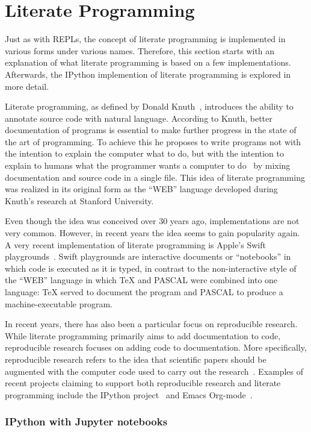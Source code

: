 \section{Literate Programming}
\label{sec:literate-programming}

Just as with REPLs, the concept of literate programming is implemented in
various forms under various names. Therefore, this section starts with an
explanation of what literate programming is based on a few implementations.
Afterwards, the IPython implemention of literate programming is explored in more
detail.

Literate programming, as defined by Donald Knuth~\cite{knuth1984}, introduces
the ability to annotate source code with natural language. According to Knuth,
better documentation of programs is essential to make further progress in the
state of the art of programming.  To achieve this he proposes to write programs
not with the intention to explain the computer what to do, but with the
intention to explain to humans what the programmer wants a computer to
do~\cite{knuth1984} by mixing documentation and source code in a single file.
This idea of literate programming was realized in its original form as the
``WEB'' language developed during Knuth's research at Stanford University.

Even though the idea was conceived over 30 years ago, implementations are not
very common. However, in recent years the idea seems to gain popularity again.
A very recent implementation of literate programming is Apple's Swift
playgrounds~\cite{swift-playgrounds}. Swift playgrounds are interactive
documents or ``notebooks'' in which code is executed as it is typed, in
contrast to the non-interactive style of the ``WEB'' language in which \TeX{} and
PASCAL were combined into one language: \TeX{} served to document the program
and PASCAL to produce a machine-executable program.

In recent years, there has also been a particular focus on reproducible
research. While literate programming primarily aims to add documentation to
code, reproducible research focuses on adding code to documentation. More
specifically, reproducible research refers to the idea that scientific papers
should be augmented with the computer code used to carry out the
research~\cite{schulte2012}. Examples of recent projects claiming to support
both reproducible research and literate programming include the IPython
project~\cite{ipython2007} and Emacs Org-mode~\cite{schulte2012}.

\subsubsection{IPython with Jupyter notebooks}

